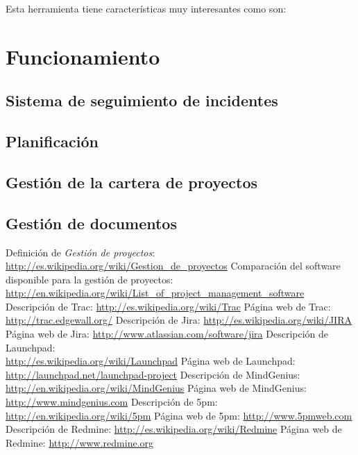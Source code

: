 \documentclass[11pt,a4paper,spanish,twoside]{report}
\begin{document}
Esta herramienta tiene características muy interesantes como son:


\section{Funcionamiento}
	\subsection{Sistema de seguimiento de incidentes}
	\subsection{Planificación}
	\subsection{Gestión de la cartera de proyectos}
	\subsection{Gestión de documentos}

\begin{thebibliography}{99}
 Definición de \emph{Gestión de proyectos}:
\\ \url{http://es.wikipedia.org/wiki/Gestion_de_proyectos}
 Comparación del software disponible para la gestión de proyectos:
\\ \url{http://en.wikipedia.org/wiki/List_of_project_management_software}
 Descripción de Trac:
  \url{http://es.wikipedia.org/wiki/Trac}
 Página web de Trac:
  \url{http://trac.edgewall.org/}
 Descripción de Jira:
  \url{http://es.wikipedia.org/wiki/JIRA}
 Página web de Jira:
  \url{http://www.atlassian.com/software/jira}
 Descripción de Launchpad:\\
  \url{http://es.wikipedia.org/wiki/Launchpad}
 Página web de Launchpad:\\
  \url{http://launchpad.net/launchpad-project}
 Descripción de MindGenius:\\
  \url{http://en.wikipedia.org/wiki/MindGenius}
 Página web de MindGenius:
  \url{http://www.mindgenius.com}
 Descripción de 5pm:
  \url{http://en.wikipedia.org/wiki/5pm}
 Página web de 5pm:
  \url{http://www.5pmweb.com}
 Descripción de Redmine:
  \url{http://es.wikipedia.org/wiki/Redmine}
 Página web de Redmine:
  \url{http://www.redmine.org}
\end{thebibliography}
\end{document}
